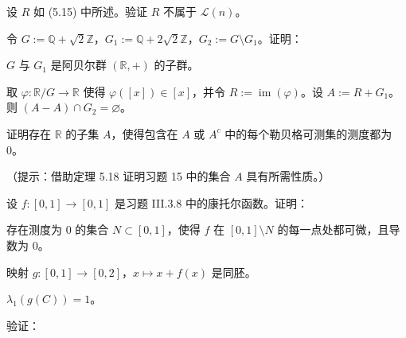 \begin{exercises}
\item

设 $ R $ 如 (5.15) 中所述。验证 $ R $ 不属于 $ \mathcal{L}(n) $。

\item

令 $ G := \mathbb{Q} + \sqrt{2}\mathbb{Z} $，$ G_1 := \mathbb{Q} + 2\sqrt{2}\mathbb{Z} $，$ G_2 := G \setminus G_1 $。证明：

\begin{items}
\item

$ G $ 与 $ G_1 $ 是阿贝尔群 $ (\mathbb{R},+) $ 的子群。

\item

取 $ \varphi : \mathbb{R}/G \to \mathbb{R} $ 使得 $ \varphi([x]) \in [x] $，并令 $ R := \operatorname{im}(\varphi) $。设 $ A := R + G_1 $。则 $ (A - A) \cap G_2 = \varnothing $。

\end{items}

\item

证明存在 $ \mathbb{R} $ 的子集 $ A $，使得包含在 $ A $ 或 $ A^{c} $ 中的每个勒贝格可测集的测度都为 0。

（提示：借助定理 5.18 证明习题 15 中的集合 $ A $ 具有所需性质。）

\item

设 $ f : [0,1] \to [0,1] $ 是习题 III.3.8 中的康托尔函数。证明：

\begin{items}
\item

存在测度为 0 的集合 $ N \subset [0,1] $，使得 $ f $ 在 $ [0,1] \setminus N $ 的每一点处都可微，且导数为 0。

\item

映射 $ g : [0,1] \to [0,2] $，$ x \mapsto x + f(x) $ 是同胚。

\item

$ \lambda_1(g(C)) = 1 $。

\end{items}

\item

验证：

\begin{items}
\item


\end{items}
\end{exercises}
